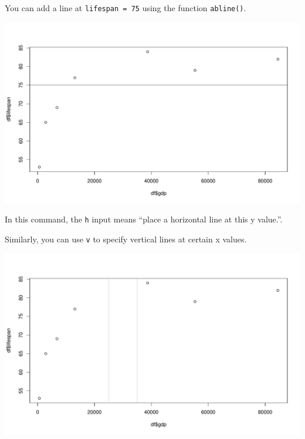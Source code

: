 \documentclass[
]{book}
\newenvironment{Shaded}{\begin{snugshade}}{\end{snugshade}}
\newcommand{\DataTypeTok}[1]{\textcolor[rgb]{0.13,0.29,0.53}{#1}}
\newcommand{\DecValTok}[1]{\textcolor[rgb]{0.00,0.00,0.81}{#1}}
\newcommand{\KeywordTok}[1]{\textcolor[rgb]{0.13,0.29,0.53}{\textbf{#1}}}
\newcommand{\NormalTok}[1]{#1}
\newcommand{\OperatorTok}[1]{\textcolor[rgb]{0.81,0.36,0.00}{\textbf{#1}}}
\newcommand{\StringTok}[1]{\textcolor[rgb]{0.31,0.60,0.02}{#1}}
\begin{document}
You can add a line at \texttt{lifespan\ =\ 75} using the function \texttt{abline()}.

\begin{Shaded}
\end{Shaded}

\includegraphics{figures/unnamed-chunk-120-1.pdf}

In this command, the \texttt{h} input means ``place a horizontal line at this y value.''.

Similarly, you can use \texttt{v} to specify vertical lines at certain x values.

\begin{Shaded}
\end{Shaded}

\includegraphics{figures/unnamed-chunk-121-1.pdf}
\end{document}
